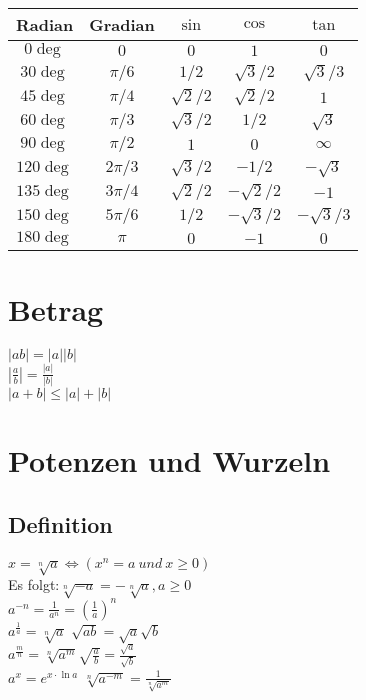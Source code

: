   \begin{example} $ $\\
  	\renewcommand{\arraystretch}{1.2}
  	\begin{tabular}{| c | c || c | c | c |}
  			\hline
        Radian & Gradian & $\sin$ & $\cos$ & $\tan$ \\
        	\hline
        $0\deg$ & $0$ & $0$ & $1$ & $0$ \\
        	\hline
        $30\deg$ & $\pi/6$ & $1/2$ & $\sqrt{3}/2$ & $\sqrt{3}/3$ \\
        	\hline
        $45\deg$ & $\pi/4$ & $\sqrt{2}/2$ & $\sqrt{2}/2$ & $1$ \\
        	\hline
        $60\deg$ & $\pi/3$ & $\sqrt{3}/2$ & $1/2$ & $\sqrt{3}$ \\
        	\hline
        $90\deg$ & $\pi/2$ & $1$ & $0$ & $\infty$ \\
        	\hline
        $120\deg$ & $2\pi/3$ & $\sqrt{3}/2$ & $-1/2$ & $-\sqrt{3}$ \\
        	\hline
        $135\deg$ & $3\pi/4$ & $\sqrt{2}/2$ & $-\sqrt{2}/2$ & $-1$ \\
        	\hline
        $150\deg$ & $5\pi/6$ & $1/2$ & $-\sqrt{3}/2$ & $-\sqrt{3}/3$ \\
        	\hline
        $180\deg$ & $\pi$ & $0$ & $-1$ & $0$ \\
        	\hline
  	\end{tabular}
  \end{example}

    \section{Betrag}
	
	$|ab|=|a||b|$\\
    $|\frac{a}{b}|=\frac{|a|}{|b|}$\\
	$|a+b|\leq |a|+|b|$
	
	
	\section{Potenzen und Wurzeln}
    
	\subsection{Definition} 
	
	$x= \sqrt[n]{a} \Leftrightarrow (x^n = a \ und \ x\geq 0)$\\
	Es folgt:$\sqrt[n]{-a}=-\sqrt[n]{a}, a \geq 0$\\
	$a^{-n} = \frac{1}{a^n}= (\frac{1}{a})^n$\\
	$a^{\frac{1}{a}}= \sqrt[n]{a}$ \tab $\sqrt{ab}=\sqrt{a}\sqrt{b}$\\
	$a^{\frac{m}{n}}= \sqrt[n]{a^m}$\tab $\sqrt{\frac{a}{b}}= \frac{\sqrt{a}}{\sqrt{b}}$\\
	$a^x= e^{x\cdot \ln a}$ \tab $\sqrt[n]{a^{-m}}= \frac{1}{\sqrt[n]{a^m}}$
	
